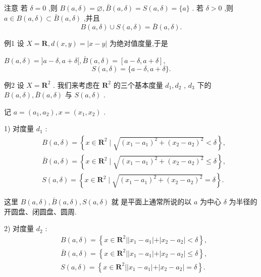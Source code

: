 注意 若 $\delta  = 0$ ,则 $B\left( {a,\delta }\right)  = \varnothing ,\bar{B}\left( {a,\delta }\right)  = S\left( {a,\delta }\right)  = \{ a\}$ . 若 $\delta  > 0$ ,则 $a \in  B\left( {a,\delta }\right)  \subset  \bar{B}\left( {a,\delta }\right)$ ,并且
$$B\left( {a,\delta }\right)  \cup  S\left( {a,\delta }\right)  = \bar{B}\left( {a,\delta }\right) .$$

例1 设 $X = \mathbf{R},d\left( {x,y}\right)  = \left| {x - y}\right|$ 为绝对值度量,于是

$B\left( {a,\delta }\right)  = \rbrack a - \delta ,a + \delta \lbrack ,\bar{B}\left( {a,\delta }\right)  = \left\lbrack  {a - \delta ,a + \delta }\right\rbrack  ,$
$$S\left( {a,\delta }\right)  = \{ a - \delta ,a + \delta \} .$$

例2 设 $X = {\mathbf{R}}^{2}$ . 我们来考虑在 ${\mathbf{R}}^{2}$ 的三个基本度量 ${d}_{1},{d}_{2}$ , ${d}_{3}$ 下的 $B\left( {a,\delta }\right) ,\bar{B}\left( {a,\delta }\right)$ 与 $S\left( {a,\delta }\right)$ .

记 $a = \left( {{a}_{1},{a}_{2}}\right) ,x = \left( {{x}_{1},{x}_{2}}\right)$ .

1) 对度量 ${d}_{1}$ :
\begin{align*}
	&B\left( {a,\delta }\right)  = \left\{  {x \in  {\mathbf{R}}^{2} \mid  \sqrt{{\left( {x}_{1} - {a}_{1}\right) }^{2} + {\left( {x}_{2} - {a}_{2}\right) }^{2}} < \delta }\right\}  ,\\
	&\bar{B}\left( {a,\delta }\right)  = \left\{  {x \in  {\mathbf{R}}^{2} \mid  \sqrt{{\left( {x}_{1} - {a}_{1}\right) }^{2} + {\left( {x}_{2} - {a}_{2}\right) }^{2}} \leq  \delta }\right\}  ,\\
	&S\left( {a,\delta }\right)  = \left\{  {x \in  {\mathbf{R}}^{2} \mid  \sqrt{{\left( {x}_{1} - {a}_{1}\right) }^{2} + {\left( {x}_{2} - {a}_{2}\right) }^{2}} = \delta }\right\}  .
\end{align*}

这里 $B\left( {a,\delta }\right) ,\bar{B}\left( {a,\delta }\right) ,S\left( {a,\delta }\right)$ 就 是平面上通常所说的以 $a$ 为中心 $\delta$ 为半径的开圆盘、闭圆盘、圆周.

2) 对度量 ${d}_{2}$ :
\begin{align*}
	&B\left( {a,\delta }\right)  = \left\{  {x \in  {\mathbf{R}}^{2}\left| \right| {x}_{1} - {a}_{1}\left| +\right| {x}_{2} - {a}_{2} \mid   < \delta }\right\}  ,\\
	&\bar{B}\left( {a,\delta }\right)  = \left\{  {x \in  {\mathbf{R}}^{2}\left| \right| {x}_{1} - {a}_{1}\left| +\right| {x}_{2} - {a}_{2} \mid   \leq  \delta }\right\}  ,\\
	&S\left( {a,\delta }\right)  = \left\{  {x \in  {\mathbf{R}}^{2}\left| \right| {x}_{1} - {a}_{1}\left| +\right| {x}_{2} - {a}_{2} \mid   = \delta }\right\}  .
\end{align*}

